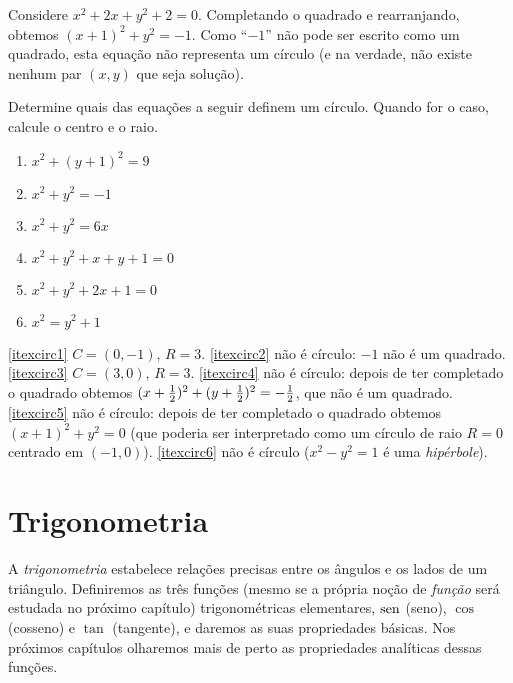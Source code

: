 \begin{ex}
Considere $x^2+2x+y^2+2=0$. Completando o quadrado e rearranjando, obtemos
$(x+1)^2+y^2=-1$. Como ``$-1$'' não pode ser escrito como um quadrado, esta equação
não representa um círculo (e na verdade, não existe nenhum par $(x,y)$ que seja
solução).
\end{ex}

\begin{exo}
Determine quais das equações a seguir definem um círculo. Quando for o caso, calcule 
o centro e o raio.
\begin{multicols}{3}
\begin{enumerate}
\item\label{itexcirc1} $x^2+(y+1)^2=9$
\item\label{itexcirc2} $x^2+y^2=-1$
\item\label{itexcirc3} $x^2+y^2=6x$
\item\label{itexcirc4} $x^2+y^2+x+y+1=0$
\item\label{itexcirc5} $x^2+y^2+2x+1=0$
\item\label{itexcirc6} $x^2=y^2+1$
\end{enumerate}
\end{multicols}
\vspace{0.01cm}
\begin{sol}
\eqref{itexcirc1} $C=(0,-1)$, $R=3$.
\eqref{itexcirc2} não é círculo: $-1$ não é um quadrado.
\eqref{itexcirc3} $C=(3,0)$, $R=3$.
 \eqref{itexcirc4} não é círculo: depois de ter completado o quadrado obtemos
$(x+\frac{1}{2})^2+(y+\frac{1}{2})^2=-\frac{1}{2}$, que não é um quadrado.
 \eqref{itexcirc5} não é círculo: depois de ter completado o quadrado obtemos
$(x+1)^2+y^2=0$ (que poderia ser interpretado como um círculo de raio $R=0$ centrado em
$(-1,0)$).
\eqref{itexcirc6} não é círculo ($x^2-y^2=1$ é
uma \emph{hipérbole}).
\end{sol}
\end{exo}

\section{Trigonometria}                                  
A \emph{trigonometria} estabelece relações precisas entre os ângulos e os
lados de um triângulo.
Definiremos as três funções (mesmo se a própria noção de \emph{função}
será estudada no próximo capítulo) 
trigonométricas elementares, $\operatorname{sen}$ (seno), $\cos$ (cosseno) e $\tan$ (tangente), e
daremos as suas propriedades básicas. Nos próximos capítulos olharemos
mais de perto as propriedades analíticas dessas funções.
    
